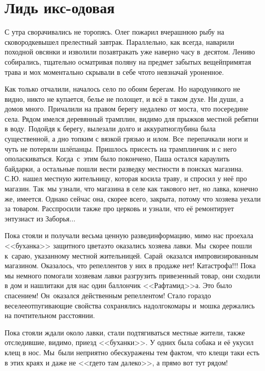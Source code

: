 \chapter{Лидь икс-одовая} 
\vepsianrose

С утра сворачивались не торопясь. Олег пожарил вчерашнюю рыбу на сковородке\mdash вышел прелестный завтрак. Параллельно, как всегда, наварили походной овсянки и изволили позавтракать уже наверно часу в~десятом. Лениво собирались, тщательно осматривая поляну на предмет забытых вещей\mdash примятая трава и мох моментально скрывали в себе что\sdash то невзначай уроненное.

Как только отчалили, началось село по обоим берегам. Но народу\mdash никого не видно, никто не купается, белье не полощет, и всё в таком духе. Ни души, а домов много. Причалили на правом берегу недалеко от моста, что посередине села. Рядом имелся деревянный трамплин, видимо для прыжков местной ребятни в воду. Подойдя к берегу, вылезали долго и аккуратно\mdash глубина была существенной, а дно топким с вязкой грязью и илом. Все~перепачкали ноги и чуть не потеряли шлёпанцы. Пришлось присесть на трамплинчик и с него ополаскиваться. Когда~с~этим было покончено, Паша остался караулить байдарки, а остальные пошли вести разведку местности в поисках магазина. С.Ю. нашел местную жительницу, которая косила траву, и спросил у неё про магазин. Так~мы узнали, что магазина в селе как такового нет, но лавка, конечно же, имеется. Однако сейчас она, скорее всего, закрыта, потому что хозяева уехали за товаром. Расспросили также про церковь и узнали, что её ремонтирует энтузиаст из Заборья$\ldots$
 
Пока стояли и получали весьма ценную развединформацию, мимо нас проехала <<буханка>> защитного цвета\mdash это оказались хозяева лавки. Мы~скорее пошли к~сараю, указанному местной жительницей. Сарай~оказался импровизированным магазином. Оказалось, что репеллентов у них в продаже нет! Катастрофа!!! Пока мы немного помогали хозяевам лавки разгрузить привезенный товар, они сходили в дом и нашли\sdash таки для нас один баллончик <<Рафтамид>>\sdash а. Это было спасением! Он~оказался действенным репеллентом! Стало гораздо веселее\mdash отпугивающие свойства сохранялись надолго\mdash комары и~мошка держались на почтительном расстоянии. 

Пока стояли ждали около лавки, стали подтягиваться местные жители, также отследившие, видимо, приезд <<буханки>>. У одних была собака и её укусил клещ в нос. Мы~были неприятно обескуражены тем фактом, что клещи таки есть в этих краях и даже не <<где\sdash то там далеко>>, а прямо вот тут рядом!

